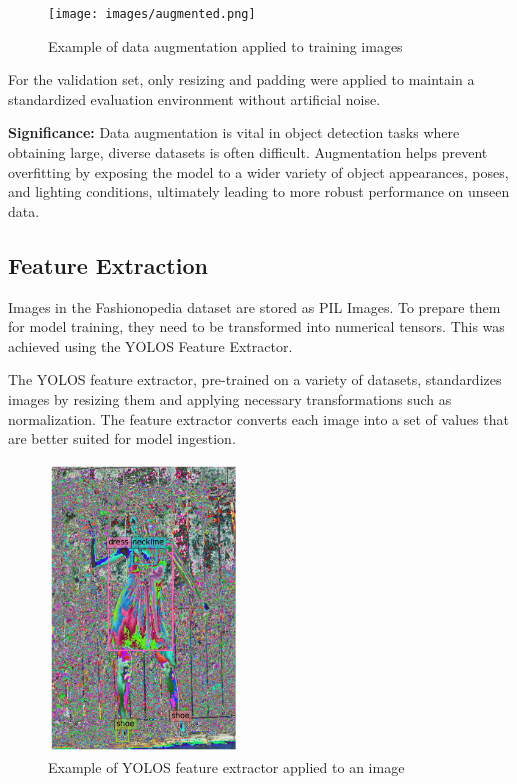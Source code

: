\begin{figure}[H]
\centering
    \texttt{[image: images/augmented.png]}
    \caption{Example of data augmentation applied to training images}
\end{figure}

For the validation set, only resizing and padding were applied to maintain a standardized evaluation environment without artificial noise.

\textbf{Significance:} Data augmentation is vital in object detection tasks where obtaining large, diverse datasets is often difficult. Augmentation helps prevent overfitting by exposing the model to a wider variety of object appearances, poses, and lighting conditions, ultimately leading to more robust performance on unseen data.

\subsection{Feature Extraction}

Images in the Fashionopedia dataset are stored as PIL Images. To prepare them for model training, they need to be transformed into numerical tensors. This was achieved using the YOLOS Feature Extractor.

The YOLOS feature extractor, pre-trained on a variety of datasets, standardizes images by resizing them and applying necessary transformations such as normalization. The feature extractor converts each image into a set of values that are better suited for model ingestion.

\begin{figure}[H]
\centering
    \includegraphics[width=0.45\textwidth]{images/yolos.png}
    \caption{Example of YOLOS feature extractor applied to an image}
\end{figure}

